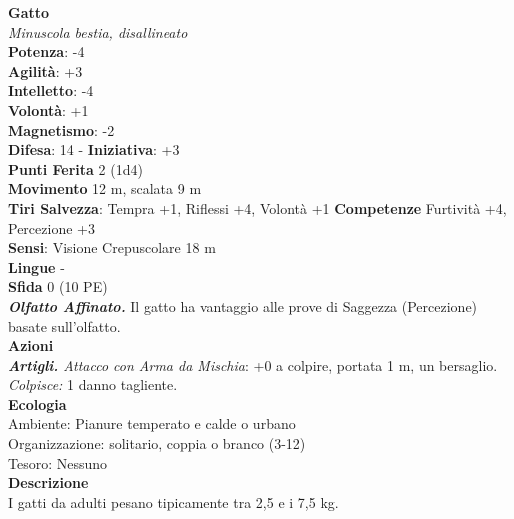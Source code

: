 \begin{multicols}{2}
\medskip\textbf{Gatto}\\
\emph{Minuscola bestia, disallineato}\\
\textbf{Potenza}: -4\\
\textbf{Agilità}: +3\\
\textbf{Intelletto}: -4\\
\textbf{Volontà}: +1\\
\textbf{Magnetismo}: -2\\
\textbf{Difesa}: 14 - \textbf{Iniziativa}: +3\\
\textbf{Punti Ferita} 2 (1d4)\\
\textbf{Movimento} 12 m, scalata 9 m\\
\textbf{Tiri Salvezza}:  Tempra +1, Riﬂessi +4, Volontà +1 
\textbf{Competenze} Furtività +4, Percezione +3\\
\textbf{Sensi}: Visione Crepuscolare 18 m\\
\textbf{Lingue} -\\
\textbf{Sfida} 0 (10 PE)\smallskip\\
\emph{\textbf{Olfatto Affinato.}} Il gatto ha vantaggio alle prove di Saggezza (Percezione) basate sull'olfatto.\\
\smallskip\textbf{Azioni}\\
\emph{\textbf{Artigli.} Attacco con Arma da Mischia}: +0 a colpire, portata 1 m, un bersaglio.\\
\emph{Colpisce:} 1 danno tagliente.\\
\textbf{Ecologia}\\
Ambiente: Pianure temperato e calde o urbano\\
Organizzazione: solitario, coppia o branco (3-12)\\
Tesoro: Nessuno\\
\textbf{Descrizione}\\
I gatti da adulti pesano tipicamente tra 2,5 e i 7,5 kg. \\


\end{multicols}
